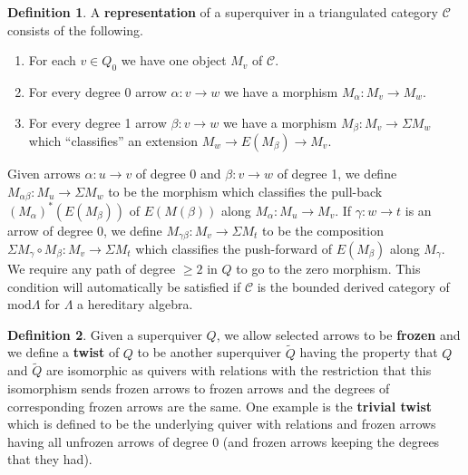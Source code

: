 \documentclass[12pt]{amsart}
\theoremstyle{plain}
\theoremstyle{definition}
\newtheorem{defn}{Definition}[section]
\theoremstyle{remark}
\begin{document}
{\begin{defn}
A \textbf{representation} of a superquiver in a triangulated category $\mathcal C$ consists of the following.
\begin{enumerate}
\item For each $v\in Q_0$ we have one object $M_v$ of $\mathcal C$.
\item For every degree 0 arrow $\alpha:v\to w$ we have a morphism $M_\alpha: M_v\to M_w$.
\item For every degree 1 arrow $\beta:v\to w$ we have a morphism $M_\beta:M_v\to \Sigma M_w$ {\color{black}which ``classifies'' an extension $M_w\to E(M_\beta)\to M_v$.}
\end{enumerate}
Given arrows $\alpha:u\to v$ of degree 0 and $\beta:v\to w$ of degree 1, {\color{black}we define $M_{\alpha\beta}:M_u\to \Sigma M_w$ to be the morphism which classifies the pull-back $(M_\alpha)^\ast(E(M_\beta))$ of $E(M(\beta))$ along $M_\alpha:M_u\to M_v$. If $\gamma:w\to t$ is an arrow of degree 0, we define $M_{\gamma\beta}:M_v\to \Sigma M_t$ to be the composition $\Sigma M_\gamma\circ M_\beta:M_v\to \Sigma M_t$ which classifies the push-forward of $E(M_{\beta})$ along $M_{\gamma}$}. We require any path of degree $\ge2$ in $Q$ to go to the zero morphism. This condition will automatically be satisfied if $\mathcal C$ is the bounded derived category of {\color{black} mod$\Lambda$} for $\Lambda$ a hereditary algebra.
\end{defn}
}

{
\begin{defn} \label{defn: superquiver twist}
    Given a superquiver $Q$, we allow selected arrows to be \textbf{frozen} and we define a \textbf{twist} of $Q$ to be another superquiver $\widetilde Q$ having the property that $Q$ {\color{black} and} $\widetilde Q$
 are isomorphic as quivers with relations with the restriction that this isomorphism sends frozen arrows to frozen arrows and the degrees of corresponding frozen arrows are the same. One example is the \textbf{trivial twist} which is defined to be the underlying quiver with relations and frozen arrows having all unfrozen arrows of degree 0 (and frozen arrows keeping the degrees that they had).
 \end{defn}
}
\end{document}
